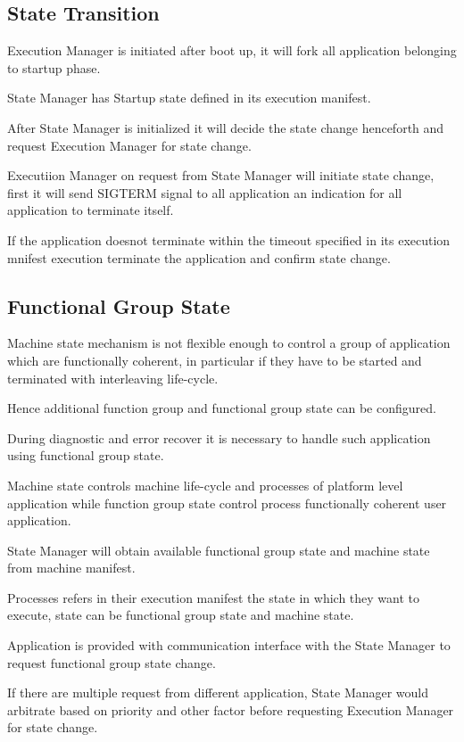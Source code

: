 \subsection*{State Transition}


\begin{DoxyItemize}
\item Execution Manager is initiated after boot up, it will fork all application belonging to startup phase.
\item State Manager has Startup state defined in its execution manifest.
\item After State Manager is initialized it will decide the state change henceforth and request Execution Manager for state change.
\item Executiion Manager on request from State Manager will initiate state change, first it will send S\+I\+G\+T\+E\+RM signal to all application an indication for all application to terminate itself.
\item If the application doesnot terminate within the timeout specified in its execution mnifest execution terminate the application and confirm state change. 
\end{DoxyItemize}

\subsection*{Functional Group State}


\begin{DoxyItemize}
\item Machine state mechanism is not flexible enough to control a group of application which are functionally coherent, in particular if they have to be started and terminated with interleaving life-\/cycle.
\item Hence additional function group and functional group state can be configured.
\item During diagnostic and error recover it is necessary to handle such application using functional group state.
\item Machine state controls machine life-\/cycle and processes of platform level application while function group state control process functionally coherent user application.
\item State Manager will obtain available functional group state and machine state from machine manifest.
\item Processes refers in their execution manifest the state in which they want to execute, state can be functional group state and machine state.
\item Application is provided with communication interface with the State Manager to request functional group state change.
\item If there are multiple request from different application, State Manager would arbitrate based on priority and other factor before requesting Execution Manager for state change. 
\end{DoxyItemize}

